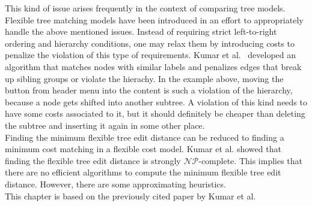 This kind of issue arises frequently in the context of comparing tree models. Flexible tree matching models have been introduced in an effort to appropriately handle the above mentioned issues. Instead of requiring strict left-to-right ordering and hierarchy conditions, one may relax them by introducing costs to penalize the violation of this type of requirements. Kumar et al.~\cite{Kum} developed an algorithm that matches nodes with similar labels and penalizes edges that break up sibling groups or violate the hierachy. In the example above, moving the button from header menu into the content is such a violation of the hierarchy, because a node gets shifted into another subtree. A violation of this kind needs to have some costs associated to it, but it should definitely be cheaper than deleting the subtree and inserting it again in some other place.\\
Finding the minimum flexible tree edit distance can be reduced to finding a minimum cost matching in a flexible cost model. Kumar et al. showed that finding the flexible tree edit distance is strongly $\mathcal{NP}$-complete. This implies that there are no efficient algorithms to compute the minimum flexible tree edit distance. However, there are some approximating heuristics.\\
This chapter is based on the previously cited paper by Kumar et al. 

